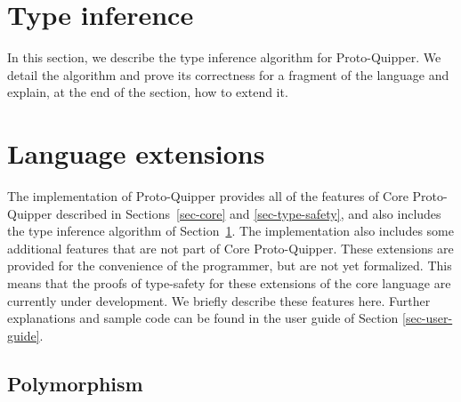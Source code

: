 \documentclass[twoside]{article}
\begin{document}
\clearpage
\section{Type inference}\label{sec-inference}

In this section, we describe the type inference algorithm 
for Proto-Quipper. We detail the algorithm and prove its 
correctness for a fragment of the language and explain, 
at the end of the section, how to extend it.




\clearpage
\section{Language extensions}
\label{sec-extensions}

The implementation of Proto-Quipper provides all of the features of
Core Proto-Quipper described in Sections~\ref{sec-core} and
{\ref{sec-type-safety}}, and also includes the type inference
algorithm of Section~\ref{sec-inference}. The implementation also
includes some additional features that are not part of Core
Proto-Quipper. These extensions are provided for the convenience of
the programmer, but are not yet formalized. This means that the proofs 
of type-safety for these extensions of the core language are 
currently under development. We briefly describe these features 
here. Further explanations and sample code can be found in the 
user guide of Section \ref{sec-user-guide}.

\subsection{Polymorphism} 
\end{document}
